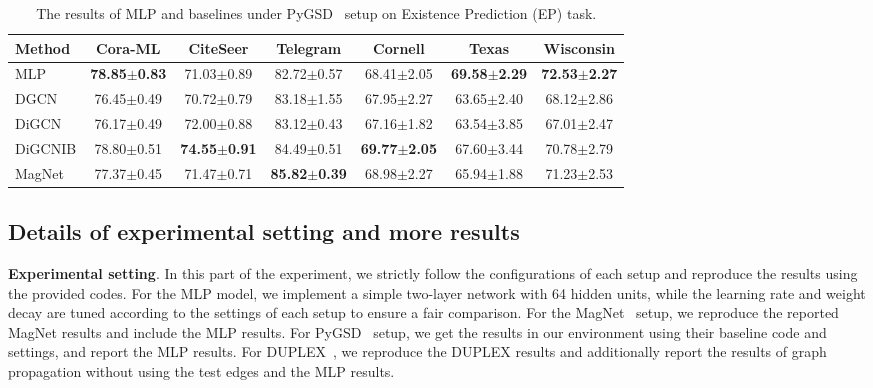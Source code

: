 \begin{table}[h]
\centering
\caption{The results of MLP and baselines under PyGSD~\cite{dpyg} setup on Existence Prediction (EP) task.}
\begin{tabular}{lcccccc}
\toprule
Method & Cora-ML & CiteSeer & Telegram & Cornell & Texas & Wisconsin \\ \midrule
MLP       & \textbf{78.85$\pm$0.83}  & 71.03$\pm$0.89  & 82.72$\pm$0.57  & 68.41$\pm$2.05  & \textbf{69.58$\pm$2.29}  & \textbf{72.53$\pm$2.27}  \\ \midrule 
DGCN      & 76.45$\pm$0.49  & 70.72$\pm$0.79  & 83.18$\pm$1.55  & 67.95$\pm$2.27  & 63.65$\pm$2.40  & 68.12$\pm$2.86    \\ 
DiGCN     & 76.17$\pm$0.49  & 72.00$\pm$0.88  & 83.12$\pm$0.43  & 67.16$\pm$1.82  & 63.54$\pm$3.85  & 67.01$\pm$2.47    \\ 
DiGCNIB   & 78.80$\pm$0.51  & \textbf{74.55$\pm$0.91}  & 84.49$\pm$0.51  & \textbf{69.77$\pm$2.05}  & 67.60$\pm$3.44  & 70.78$\pm$2.79   \\ 
MagNet    & 77.37$\pm$0.45  & 71.47$\pm$0.71  & \textbf{85.82$\pm$0.39}  & 68.98$\pm$2.27  & 65.94$\pm$1.88  & 71.23$\pm$2.53    \\  \bottomrule
\end{tabular}%
\label{tb_dpyg_ep}
\end{table}



\hypertarget{app_issues_results}{} 
\subsection{Details of experimental setting and more results}\label{app_issues_results}
\textbf{Experimental setting}. In this part of the experiment, we strictly follow the configurations of each setup and reproduce the results using the provided codes. For the MLP model, we implement a simple two-layer network with 64 hidden units, while the learning rate and weight decay are tuned according to the settings of each setup to ensure a fair comparison. For the MagNet~\cite{magnet} setup, we reproduce the reported MagNet results and include the MLP results. For PyGSD~\cite{dpyg} setup, we get the results in our environment using their baseline code and settings, and report the MLP results. For DUPLEX~\cite{duplex}, we reproduce the DUPLEX results and additionally report the results of graph propagation without using the test edges and the MLP results.

